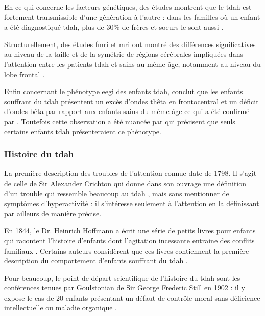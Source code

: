 En ce qui concerne les facteurs génétiques, des études montrent que le \gls{tdah} est fortement transmissible d'une génération à l'autre \citep{Larsson2014} :
dans les familles où un enfant a été diagnostiqué \gls{tdah}, plus de 30\% de frères et soeurs le sont aussi \citep{Monastra2005}.

Structurellement, des études \gls{fmri} et \gls{mri} ont montré des différences significatives au niveau de la taille et de la symétrie de régions cérébrales impliquées
dans l'attention entre les patients \gls{tdah} et sains au même âge, notamment au niveau du lobe frontal \citep{Monastra2005}.  

Enfin concernant le phénotype \gls{eegi} des enfants \gls{tdah}, \citet{Lubar1991} conclut que les enfants souffrant du \gls{tdah} présentent un excès 
d'ondes thêta en frontocentral \citep{Loo2010} et un déficit d'ondes bêta par rapport aux enfants sains du même âge ce qui a été confirmé par \citet{Barry2003}. Toutefois cette observation 
a été nuancée par \citet{Arns2012} qui précisent que seuls certains enfants \gls{tdah} présenteraient ce phénotype. 

\subsubsection{Histoire du \gls{tdah}} \label{adhd_history}

La première description des troubles de l'attention connue date de 1798. Il s'agit de celle de Sir Alexander Crichton qui donne dans son ouvrage 
une définition d'un trouble 
qui ressemble beaucoup au \gls{tdah} \citep{Crichton1798}, mais sans mentionner de symptômes d'hyperactivité : il s'intéresse seulement à l'attention
en la définissant par ailleurs de manière précise. 

En 1844, le Dr. Heinrich Hoffmann a écrit une série de petits livres pour enfants qui racontent l'histoire d'enfants dont l'agitation incessante 
entraine des conflits familiaux \citep{Lange2010}. Certains auteurs considèrent que ces livres contiennent la première description du comportement d'enfants 
souffrant du \gls{tdah} \citep{Burd1988, Kopf2006}.  

Pour beaucoup, le point de départ scientifique de l'histoire du \gls{tdah} sont les conférences tenues par Goulstonian de Sir George Frederic Still 
en 1902 \citep{Barkley2006, Conners2000, Palmer2001, Rafalovich2001} : il y expose le cas de 20 enfants présentant un défaut de contrôle moral sans
déficience intellectuelle ou maladie organique \citep{Still1902}. 

